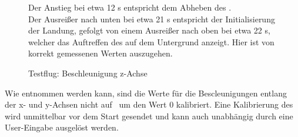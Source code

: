 \begin{figure}[ht!]
\vspace{0.25cm}
\begin{center}
\caption{Testflug: Beschleunigung z-Achse}
\label{fig:Flightaz}
\end{center}

\vspace{0.25cm}
Der Anstieg bei etwa 12 s entspricht dem Abheben des \Quad[s].\\
Der Ausreißer nach unten bei etwa 21 s entspricht der Initialisierung der Landung, gefolgt von einem Ausreißer nach oben bei etwa 22 s, welcher das Auftreffen des \Quad[s] auf dem Untergrund anzeigt. Hier ist von korrekt gemessenen Werten auszugehen.
\end{figure}












\FloatBarrier
{}









Wie  entnommen werden kann, sind die Werte für die Bescleunigungen entlang der x- und y-Achsen nicht auf \bzw\ um den Wert 0 kalibriert. Eine Kalibrierung des \Quad[s] wird unmittelbar vor dem Start gesendet und kann auch unabhängig durch eine User-Eingabe ausgelöst werden.


